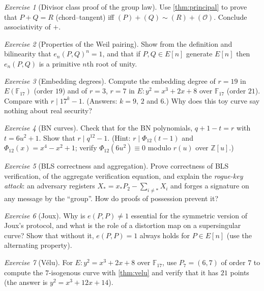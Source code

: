 \documentclass[11pt,a4paper,oneside]{book}
\theoremstyle{plain}
\theoremstyle{definition}
\theoremstyle{remark}
\newtheorem{exercise}{Exercise}[chapter]
\newcommand{\Z}{\mathbb{Z}}
\newcommand{\F}{\mathbb{F}}
\newcommand{\Oinf}{\mathcal{O}}
\begin{document}
\begin{exercise}[Divisor class proof of the group law]
Use \cref{thm:principal} to prove that $P+Q=R$ (chord--tangent) iff $(P)+(Q)\sim(R)+(\Oinf)$. Conclude associativity of $+$.
\end{exercise}

\begin{exercise}[Properties of the Weil pairing]
Show from the definition and bilinearity that $e_n(P,Q)^n=1$, and that if $P,Q\in E[n]$ generate $E[n]$ then $e_n(P,Q)$ is a primitive $n$th root of unity.
\end{exercise}

\begin{exercise}[Embedding degrees]
Compute the embedding degree of $r=19$ in $E(\F_{17})$ (order $19$) and of $r=3$, $r=7$ in $E:y^2=x^3+2x+8$ over $\F_{17}$ (order $21$). Compare with $r\mid 17^k-1$. (Answers: $k=9$, $2$ and $6$.) Why does this toy curve say nothing about real security?
\end{exercise}

\begin{exercise}[BN curves]
Check that for the BN polynomials, $q+1-t=r$ with $t=6u^2+1$. Show that $r\mid q^{12}-1$. (Hint: $r\mid\Phi_{12}(t-1)$ and $\Phi_{12}(x)=x^4-x^2+1$; verify $\Phi_{12}(6u^2)\equiv0$ modulo $r(u)$ over $\Z[u]$.)
\end{exercise}

\begin{exercise}[BLS correctness and aggregation]
Prove correctness of BLS verification, of the aggregate verification equation, and explain the \emph{rogue-key attack}: an adversary registers $X_*=x_*P_2-\sum_{i\ne *}X_i$ and forges a signature on any message by the ``group''. How do proofs of possession prevent it?
\end{exercise}

\begin{exercise}[Joux]
Why is $e(P,P)\neq1$ essential for the symmetric version of Joux's protocol, and what is the role of a distortion map on a supersingular curve? Show that without it, $e(P,P)=1$ always holds for $P\in E[n]$ (use the alternating property).
\end{exercise}

\begin{exercise}[V\'elu]
For $E:y^2=x^3+2x+8$ over $\F_{17}$, use $P_7=(6,7)$ of order $7$ to compute the $7$-isogenous curve with \cref{thm:velu} and verify that it has $21$ points (the answer is $y^2=x^3+12x+14$).
\end{exercise}
\end{document}
